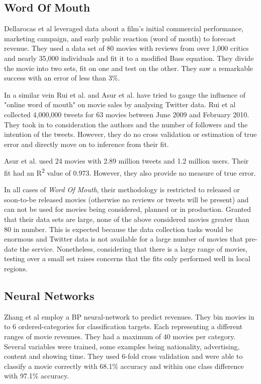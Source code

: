 \documentclass[conference]{IEEEtran}
\begin{document}
\subsection{Word Of Mouth}
Dellarocas et al\cite{dellarocas} leveraged data about a film's initial commercial 
performance, marketing campaign, and early public reaction (word of mouth) 
to forecast revenue. They used a data set of 80 movies with reviews
from over 1,000 critics and nearly 35,000 individuals and fit it to a modified Bass equation. 
They divide the movie into two sets, fit on one and test on the other. They saw a remarkable
success with an error of less than 3\%. 

In a similar vein Rui et al.\cite{rui} and Asur et al.\cite{asur} have tried to gauge the 
influence of "online word of mouth" on movie sales by analysing Twitter data. Rui et al
collected 4,000,000 tweets for 63 movies between June 2009 and February 2010. They took in 
to consideration the authors and the number of followers and the intention of the tweets.
However, they do no cross validation or estimation of true error and directly move on 
to inference from their fit.

Asur et al. used 24 movies with 2.89 million tweets and 1.2 million users. Their fit 
had an R\textsuperscript{2} value of 0.973. However, they also provide no measure
of true error. 

In all cases of \textit{Word Of Mouth}, their methodology is restricted to released
or soon-to-be released movies (otherwise no reviews or tweets will be present) and 
can not be used for movies being considered, planned or in production. Granted that their 
data sets are large, none of the above considered movies greater than 80 in number. This is 
expected because the data collection tasks would be enormous and Twitter data is not available for 
a large number of movies that pre-date the service. Nonetheless, considering that there
is a large range of movies, testing over a small set raises concerns that the fits only 
performed well in local regions.

\subsection{Neural Networks}
Zhang et al\cite{zhang} employ a BP neural-network to predict revenues. They bin
movies in to 6 ordered-categories for classification targets. 
Each representing a different ranges of movie revenues. They
had a maximum of 40 movies per category. Several variables were trained,
some examples being nationality, advertising, content and showing time. They used 
6-fold cross validation and were able to classify a movie correctly with 68.1\%
accuracy and within one class difference with 97.1\% accuracy. 
\end{document}
